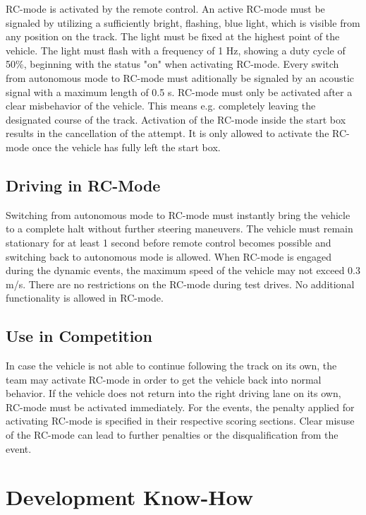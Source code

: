 RC-mode is activated by the remote control. An active RC-mode must be signaled by utilizing a sufficiently bright, flashing, blue light, which is visible from any position on the track.
The light must be fixed at the highest point of the vehicle.
The light must flash with a frequency of 1 Hz, showing a duty cycle of 50\%, beginning with the status "on" when activating RC-mode.
Every switch from autonomous mode to RC-mode must aditionally be signaled by an acoustic signal with a maximum length of 0.5 s.
RC-mode must only be activated after a clear misbehavior of the vehicle.
This means e.g. completely leaving the designated course of the track.
Activation of the RC-mode inside the start box results in the cancellation of the attempt.
It is only allowed to activate the RC-mode once the vehicle has fully left the start box.

\subsection{Driving in RC-Mode}

Switching from autonomous mode to RC-mode must instantly bring the vehicle to a complete halt without further steering maneuvers.
The vehicle must remain stationary for at least 1 second before remote control becomes possible and switching back to autonomous mode is allowed.
When RC-mode is engaged during the dynamic events, the maximum speed of the vehicle may not exceed 0.3 m/s.
There are no restrictions on the RC-mode during test drives.
No additional functionality is allowed in RC-mode.

\subsection{Use in Competition}

In case the vehicle is not able to continue following the track on its own, the team may activate RC-mode in order to get the vehicle back into normal behavior.
If the vehicle does not return into the right driving lane on its own, RC-mode must be activated immediately.
For the events, the penalty applied for activating RC-mode is specified in their respective scoring sections.
Clear misuse of the RC-mode can lead to further penalties or the disqualification from the event.

\section{Development Know-How}
\label{dev_know_how}

